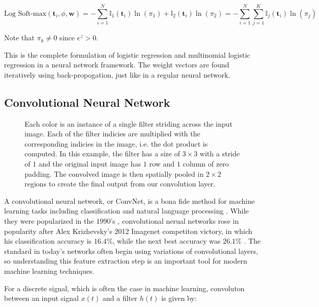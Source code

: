 \documentclass[11pt]{article}
\begin{document}
\begin{equation} \label{eq:cross_entropy}
  \text{Log Soft-max}\left(\mathbf{t}_{i},\phi,\mathbf{w}\right) = - \sum_{i=1}^{N} \mathbb{I}_{1}\left(\mathbf{t}_{i}\right)\ln\left(\pi_{1}\right) + \mathbb{I}_{2}\left(\mathbf{t}_{i}\right)\ln\left(\pi_{2}\right) = - \sum_{i=1}^{N}  \sum_{j=1}^{K} \mathbb{I}_{j}\left(\mathbf{t}_{i}\right) \ln\left(\pi_{j}\right)
\end{equation}

Note that $\pi_{k} \neq 0$ since $e^{z} > 0$. 

This is the complete formulation of logistic regression and multinomial logistic regression in a neural network framework. The weight vectors are found iteratively using back-propogation, just like in a regular neural network.

\subsection{Convolutional Neural Network}

\begin{figure}[H]
  
  \caption{Each color is an instance of a single filter striding across the input image. Each of the filter indicies are multiplied with the corresponding indicies in the image, i.e. the dot product is computed. In this example, the filter has a size of $3\times3$ with a stride of $1$ and the original input image has $1$ row and $1$ column of zero padding. The convolved image is then spatially pooled in $2\times2$ regions to create the final output from our convolution layer.}
  \label{fig:conv_net}
\end{figure}

\par
A convolutional neural network, or ConvNet, is a bona fide method for machine learning tasks including classification and natural language processing \cite{Lecun98}\cite{alexnet}\cite{residual_cnn}\cite{oxford_vgg}\cite{nlp_cnn}. While they were popularized in the $1990$'s \cite{Lecun98}, convolutional nerual networks rose in popularity after Alex Krizhevsky's 2012 Imagenet competiton victory, in which his classification accuracy is $16.4\%$, while the next best accuracy was $26.1\%$ \cite{ILSVRC15}\cite{alexnet}. The standard in today's networks often begin using variations of convolutional layers, so understanding this feature extraction step is an important tool for modern machine learning techniques.

\par
For a discrete signal, which is often the case in machine learning, convoluton between an input signal $x(t)$ and a filter $h(t)$ is given by:
\end{document}

